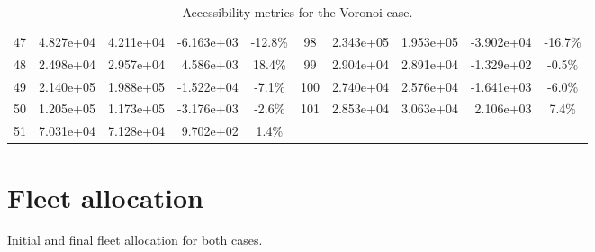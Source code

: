 \begin{table}
\begin{tabular}{|c|r|r|r|c||c|r|r|r|c|}
        47          & 4.827e+04        & 4.211e+04      & -6.163e+03      & -12.8\%              & 98          & 2.343e+05        & 1.953e+05      & -3.902e+04      & -16.7\%              \\
        48          & 2.498e+04        & 2.957e+04      & 4.586e+03       & 18.4\%               & 99          & 2.904e+04        & 2.891e+04      & -1.329e+02      & -0.5\%               \\
        49          & 2.140e+05        & 1.988e+05      & -1.522e+04      & -7.1\%               & 100         & 2.740e+04        & 2.576e+04      & -1.641e+03      & -6.0\%               \\
        50          & 1.205e+05        & 1.173e+05      & -3.176e+03      & -2.6\%               & 101         & 2.853e+04        & 3.063e+04      & 2.106e+03       & 7.4\%                \\
        51          & 7.031e+04        & 7.128e+04      & 9.702e+02       & 1.4\%                &             &                  &                &                 &                      \\
        \hline
    \end{tabular}
    \caption{Accessibility metrics for the Voronoi case.}
    \label{tab:vor_results:app}
\end{table}
\restoregeometry

\section{Fleet allocation}\label{app:fleet}
Initial and final fleet allocation for both cases.


